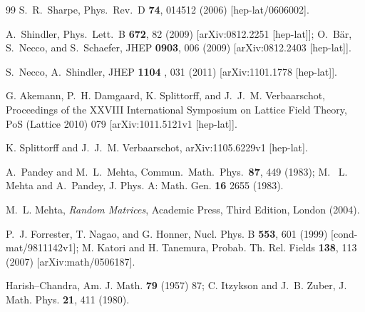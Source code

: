 \documentclass[11pt]{article}
\begin{document}
\begin{thebibliography}{99}
 S.~R.~Sharpe,
  Phys.\ Rev.\  D {\bf 74}, 014512 (2006)
  [hep-lat/0606002].

  A.~Shindler,
  Phys.\ Lett.\  B {\bf 672}, 82 (2009)
  [arXiv:0812.2251 [hep-lat]];\newline
  O.~B\"ar, S.~Necco, and S.~Schaefer,
  JHEP {\bf 0903}, 006 (2009) 
  [arXiv:0812.2403 [hep-lat]].

  S.~Necco, A.~Shindler,
  JHEP {\bf 1104 }, 031 (2011)  
  [arXiv:1101.1778 [hep-lat]].

 G. Akemann,
P.~H. Damgaard, K. Splittorff, and J.~J.~M. Verbaarschot,
Proceedings of the XXVIII International Symposium on Lattice Field
Theory,  PoS (Lattice 2010) 079
[arXiv:1011.5121v1 [hep-lat]].

 K. Splittorff and J.~J.~M. Verbaarschot,
arXiv:1105.6229v1 [hep-lat].

  A.~Pandey and M.~L.~Mehta,
  Commun.\ Math.\ Phys.\  {\bf 87},  449 (1983);\newline
M.~ L.~ Mehta and A.~Pandey,
J. Phys. A: Math. Gen. {\bf 16} 2655 (1983).

M.~L. Mehta, {\it Random Matrices}, Academic Press, Third
Edition, London (2004).

P.~J. Forrester, T. Nagao, and G. Honner,
Nucl. Phys. B {\bf  553}, 601
(1999) [cond-mat/9811142v1];\newline
M. Katori and H. Tanemura, 
Probab. Th. Rel. Fields {\bf 138}, 113 (2007) [arXiv:math/0506187].

Harish--Chandra, Am. J. Math. {\bf 79} (1957) 87;\newline
C. Itzykson and J.~B. Zuber, J. Math. Phys. {\bf 21}, 411 (1980).


\end{thebibliography}
\end{document}
